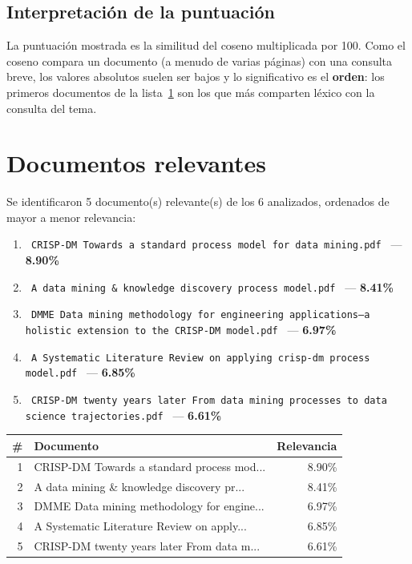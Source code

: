 \documentclass[11pt,a4paper]{article}
\newcommand{\nombrearchivo}[1]{\texttt{#1}}
\newcommand{\pcento}{\%}
\begin{document}
\subsection{Interpretación de la puntuación}

La puntuación mostrada es la similitud del coseno multiplicada por 100. Como
el coseno compara un documento (a menudo de varias páginas) con una consulta
breve, los valores absolutos suelen ser bajos y lo significativo es el
\textbf{orden}: los primeros documentos de la lista~\ref{sec:relevantes} son
los que más comparten léxico con la consulta del tema.

\section{Documentos relevantes}
\label{sec:relevantes}

Se identificaron 5 documento(s) relevante(s) de los
6 analizados, ordenados de mayor a menor relevancia:

\begin{enumerate}
\setlength{\itemsep}{6pt}
\renewcommand{\labelenumi}{\arabic{enumi}.}
  \item \nombrearchivo{ CRISP-DM Towards a standard process model for data mining.pdf } --- \textbf{ 8.90\pcento}
  \item \nombrearchivo{ A data mining \& knowledge discovery process model.pdf } --- \textbf{ 8.41\pcento}
  \item \nombrearchivo{ DMME Data mining methodology for engineering applications–a holistic extension to the CRISP-DM model.pdf } --- \textbf{ 6.97\pcento}
  \item \nombrearchivo{ A Systematic Literature Review on applying crisp-dm process model.pdf } --- \textbf{ 6.85\pcento}
  \item \nombrearchivo{ CRISP-DM twenty years later From data mining processes to data science trajectories.pdf } --- \textbf{ 6.61\pcento}
\end{enumerate}

\begin{center}
\begin{tabular}{r p{8.5cm} r}
\hline
\textbf{\#} & \textbf{Documento} & \textbf{Relevancia} \\
\hline
1 & CRISP-DM Towards a standard process mod... & 8.90\pcento \\
2 & A data mining \& knowledge discovery pr... & 8.41\pcento \\
3 & DMME Data mining methodology for engine... & 6.97\pcento \\
4 & A Systematic Literature Review on apply... & 6.85\pcento \\
5 & CRISP-DM twenty years later From data m... & 6.61\pcento \\
\hline
\end{tabular}
\end{center}
\end{document}
